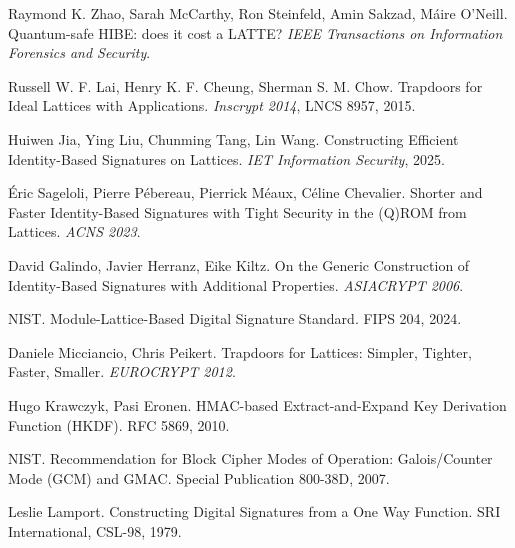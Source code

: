\documentclass[UTF8,a4paper,12pt,oneside,openany,fontset=fandol]{ctexrep}
\begin{document}
\noindent[2] Raymond K. Zhao, Sarah McCarthy, Ron Steinfeld, Amin Sakzad, Máire O'Neill. Quantum-safe HIBE: does it cost a LATTE? \emph{IEEE Transactions on Information Forensics and Security}.\par

\noindent[3] Russell W. F. Lai, Henry K. F. Cheung, Sherman S. M. Chow. Trapdoors for Ideal Lattices with Applications. \emph{Inscrypt 2014}, LNCS 8957, 2015.\par

\noindent[4] Huiwen Jia, Ying Liu, Chunming Tang, Lin Wang. Constructing Efficient Identity-Based Signatures on Lattices. \emph{IET Information Security}, 2025.\par

\noindent[5] Éric Sageloli, Pierre Pébereau, Pierrick Méaux, Céline Chevalier. Shorter and Faster Identity-Based Signatures with Tight Security in the (Q)ROM from Lattices. \emph{ACNS 2023}.\par

\noindent[6] David Galindo, Javier Herranz, Eike Kiltz. On the Generic Construction of Identity-Based Signatures with Additional Properties. \emph{ASIACRYPT 2006}.\par

\noindent[7] NIST. Module-Lattice-Based Digital Signature Standard. FIPS 204, 2024.\par

\noindent[8] Daniele Micciancio, Chris Peikert. Trapdoors for Lattices: Simpler, Tighter, Faster, Smaller. \emph{EUROCRYPT 2012}.\par

\noindent[9] Hugo Krawczyk, Pasi Eronen. HMAC-based Extract-and-Expand Key Derivation Function (HKDF). RFC 5869, 2010.\par

\noindent[10] NIST. Recommendation for Block Cipher Modes of Operation: Galois/Counter Mode (GCM) and GMAC. Special Publication 800-38D, 2007.\par

\noindent[11] Leslie Lamport. Constructing Digital Signatures from a One Way Function. SRI International, CSL-98, 1979.\par
\endgroup
\end{document}
